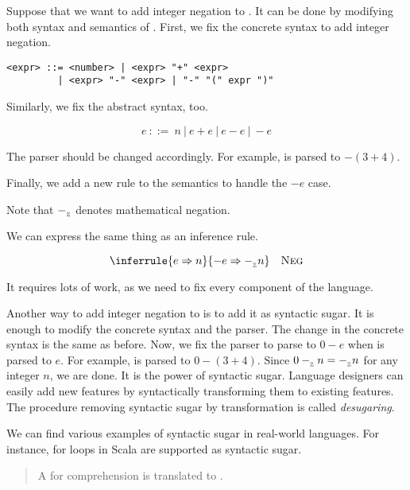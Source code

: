 Suppose that we want to add integer negation to \lang. It can be done by
modifying both syntax and semantics of \lang. First, we fix the concrete syntax
to add integer negation.

\begin{verbatim}
<expr> ::= <number> | <expr> "+" <expr>
         | <expr> "-" <expr> | "-" "(" expr ")"
\end{verbatim}

Similarly, we fix the abstract syntax, too.

\[e\ ::=\ n\ |\ e+e\ |\ e-e\ |\ -e\]

The parser should be changed accordingly. For example,  is parsed
to $-(3+4)$.

Finally, we add a new rule to the semantics to handle the $-e$ case.


Note that $-_{{}_{\mathbb{Z}}}$ denotes mathematical negation.

We can express the same thing as an inference rule.

\[
  \inferrule
  { e\Rightarrow n}
  { -e\Rightarrow\isub n }
  \quad\textsc{Neg}
\]

It requires lots of work, as we need to fix every component of the language.

Another way to add integer negation to \lang is to add it as syntactic sugar. It
is enough to modify the concrete syntax and the parser. The change in the
concrete syntax is the same as before. Now, we fix the parser to parse  to $0-e$ when  is parsed to $e$. For example,
 is parsed to $0-(3+4)$. Since $0-_{{}_{\mathbb{Z}}} n=-_{{}_{\mathbb{Z}}} n$ for any integer
$n$, we are done. It is the power of syntactic sugar. Language designers can
easily add new features by syntactically transforming them to existing features.
The procedure removing syntactic sugar by transformation is called
\textit{desugaring}.

We can find various examples of syntactic sugar in real-world languages. For
instance, for loops in Scala are supported as syntactic sugar.

\begin{quote}
  A for comprehension  is translated to
  .
\end{quote}

